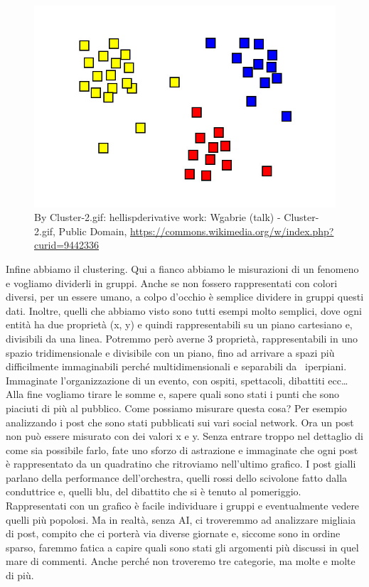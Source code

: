 \documentclass[12pt]{book} %
\begin{document}
\begin{figure}
  \centering
  \includegraphics[width=0.95\linewidth]{images/Libro-img048.jpg}
  \begin{minipage}{\linewidth}
    \caption{By Cluster-2.gif: hellispderivative work: Wgabrie
(talk) - Cluster-2.gif, Public Domain, \protect\url{https://commons.wikimedia.org/w/index.php?curid=9442336} }
  \end{minipage}
\end{figure}

Infine abbiamo il clustering. Qui a fianco abbiamo le misurazioni di un fenomeno e vogliamo dividerli in gruppi. Anche
se non fossero rappresentati con colori diversi, per un essere umano, a colpo d'occhio è semplice
dividere in gruppi questi dati. Inoltre, quelli che abbiamo visto sono tutti esempi molto semplici, dove ogni entità ha
due proprietà (x, y) e quindi rappresentabili su un piano cartesiano e, divisibili da una linea. Potremmo però averne 3
proprietà, rappresentabili in uno spazio tridimensionale e divisibile con un piano, fino ad arrivare a spazi più
difficilmente immaginabili perché multidimensionali e separabili da \ iperpiani. Immaginate
l'organizzazione di un evento, con ospiti, spettacoli, dibattiti ecc… Alla fine vogliamo tirare le
somme e, sapere quali sono stati i punti che sono piaciuti di più al pubblico. Come possiamo misurare questa cosa? Per
esempio analizzando i post che sono stati pubblicati sui vari social network. Ora un post non può essere misurato con
dei valori x e y. Senza entrare troppo nel dettaglio di come sia possibile farlo, fate uno sforzo di astrazione e
immaginate che ogni post è rappresentato da un quadratino che ritroviamo nell'ultimo grafico. I
post gialli parlano della performance dell'orchestra, quelli rossi dello scivolone fatto dalla
conduttrice e, quelli blu, del dibattito che si è tenuto al pomeriggio. Rappresentati con un grafico è facile
individuare i gruppi e eventualmente vedere quelli più popolosi. Ma in realtà, senza AI, ci troveremmo ad analizzare
migliaia di post, compito che ci porterà via diverse giornate e, siccome sono in ordine sparso, faremmo fatica a capire
quali sono stati gli argomenti più discussi in quel mare di commenti. Anche perché non troveremo tre categorie, ma
molte e molte di più.
\end{document}
